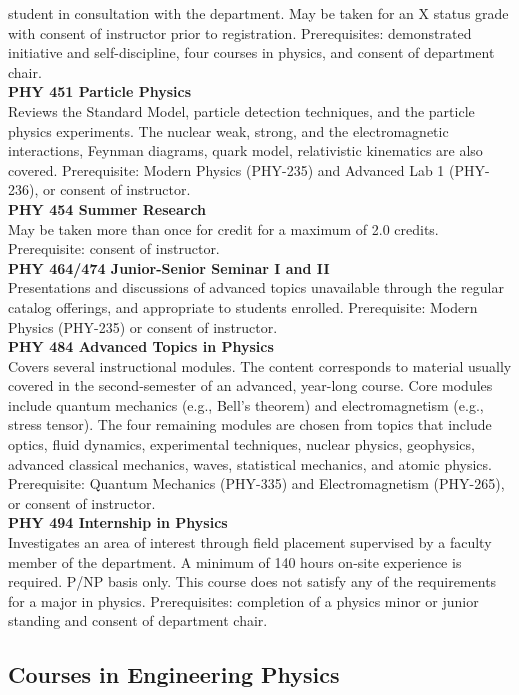 \documentclass[
  letterpaper,
]{scrbook}
\begin{document}
student in consultation with the department. May be taken for an X
status grade with consent of instructor prior to registration.
Prerequisites: demonstrated initiative and self-discipline, four courses
in physics, and consent of department chair.\\
\textbf{PHY 451 Particle Physics}\\
Reviews the Standard Model, particle detection techniques, and the
particle physics experiments. The nuclear weak, strong, and the
electromagnetic interactions, Feynman diagrams, quark model,
relativistic kinematics are also covered. Prerequisite: Modern Physics
(PHY-235) and Advanced Lab 1 (PHY-236), or consent of instructor.\\
\textbf{PHY 454 Summer Research}\\
May be taken more than once for credit for a maximum of 2.0 credits.
Prerequisite: consent of instructor.\\
\textbf{PHY 464/474 Junior-Senior Seminar I and II}\\
Presentations and discussions of advanced topics unavailable through the
regular catalog offerings, and appropriate to students enrolled.
Prerequisite: Modern Physics (PHY-235) or consent of instructor.\\
\textbf{PHY 484 Advanced Topics in Physics}\\
Covers several instructional modules. The content corresponds to
material usually covered in the second-semester of an advanced,
year-long course. Core modules include quantum mechanics (e.g., Bell's
theorem) and electromagnetism (e.g., stress tensor). The four remaining
modules are chosen from topics that include optics, fluid dynamics,
experimental techniques, nuclear physics, geophysics, advanced classical
mechanics, waves, statistical mechanics, and atomic physics.
Prerequisite: Quantum Mechanics (PHY-335) and Electromagnetism
(PHY-265), or consent of instructor.\\
\textbf{PHY 494 Internship in Physics}\\
Investigates an area of interest through field placement supervised by a
faculty member of the department. A minimum of 140 hours on-site
experience is required. P/NP basis only. This course does not satisfy
any of the requirements for a major in physics. Prerequisites:
completion of a physics minor or junior standing and consent of
department chair.

\subsection{Courses in Engineering
Physics}\label{courses-in-engineering-physics}
\end{document}
